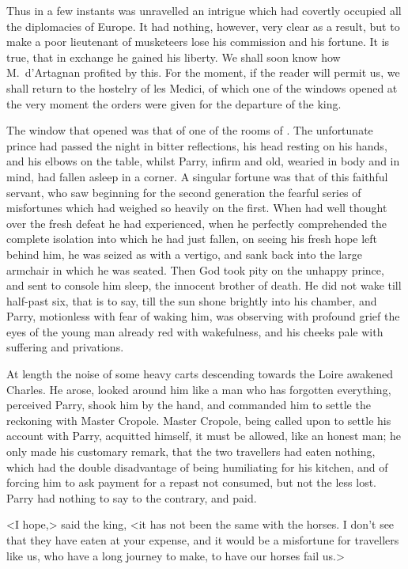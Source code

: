 Thus in a few instants was unravelled an intrigue which had covertly occupied all the diplomacies of Europe. It had nothing, however, very clear as a result, but to make a poor lieutenant of musketeers lose his commission and his fortune. It is true, that in exchange he gained his liberty. We shall soon know how M.~d'Artagnan profited by this. For the moment, if the reader will permit us, we shall return to the hostelry of les Medici, of which one of the windows opened at the very moment the orders were given for the departure of the king.

The window that opened was that of one of the rooms of . The unfortunate prince had passed the night in bitter reflections, his head resting on his hands, and his elbows on the table, whilst Parry, infirm and old, wearied in body and in mind, had fallen asleep in a corner. A singular fortune was that of this faithful servant, who saw beginning for the second generation the fearful series of misfortunes which had weighed so heavily on the first. When  had well thought over the fresh defeat he had experienced, when he perfectly comprehended the complete isolation into which he had just fallen, on seeing his fresh hope left behind him, he was seized as with a vertigo, and sank back into the large armchair in which he was seated. Then God took pity on the unhappy prince, and sent to console him sleep, the innocent brother of death. He did not wake till half-past six, that is to say, till the sun shone brightly into his chamber, and Parry, motionless with fear of waking him, was observing with profound grief the eyes of the young man already red with wakefulness, and his cheeks pale with suffering and privations.

At length the noise of some heavy carts descending towards the Loire awakened Charles. He arose, looked around him like a man who has forgotten everything, perceived Parry, shook him by the hand, and commanded him to settle the reckoning with Master Cropole. Master Cropole, being called upon to settle his account with Parry, acquitted himself, it must be allowed, like an honest man; he only made his customary remark, that the two travellers had eaten nothing, which had the double disadvantage of being humiliating for his kitchen, and of forcing him to ask payment for a repast not consumed, but not the less lost. Parry had nothing to say to the contrary, and paid.

<I hope,> said the king, <it has not been the same with the horses. I don't see that they have eaten at your expense, and it would be a misfortune for travellers like us, who have a long journey to make, to have our horses fail us.>

